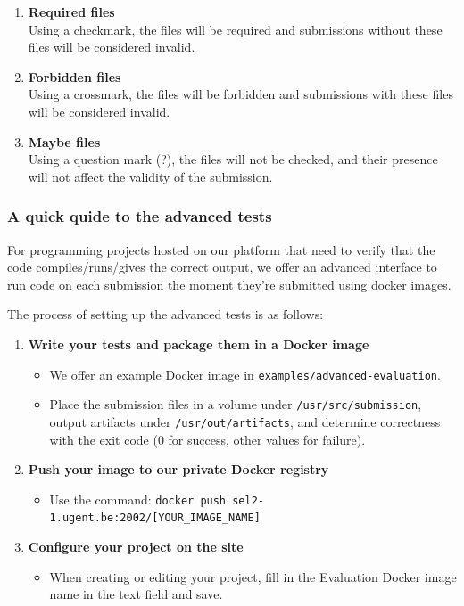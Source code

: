 \documentclass{article}
\begin{document}
\begin{enumerate}[label=\arabic*.]
    \item \textbf{Required files}\\
    Using a checkmark, the files will be required and submissions without these files will be considered invalid.
    
    \item \textbf{Forbidden files}\\
    Using a crossmark, the files will be forbidden and submissions with these files will be considered invalid.
    
    \item \textbf{Maybe files}\\
    Using a question mark (?), the files will not be checked, and their presence will not affect the validity of the submission.
\end{enumerate}

\subsubsection{A quick quide to the advanced tests}

For programming projects hosted on our platform that need to verify that the code compiles/runs/gives the correct output, we offer an advanced interface to run code on each submission the moment they're submitted using docker images.

The process of setting up the advanced tests is as follows:
\begin{enumerate}[label=\textbf{\arabic*.}]
    \item \textbf{Write your tests and package them in a Docker image}
    \begin{itemize}
        \item We offer an example Docker image in \texttt{examples/advanced-evaluation}.
        \item Place the submission files in a volume under \texttt{/usr/src/submission}, output artifacts under \texttt{/usr/out/artifacts}, and determine correctness with the exit code (0 for success, other values for failure).
    \end{itemize}
    
    \item \textbf{Push your image to our private Docker registry}
    \begin{itemize}
        \item Use the command: \texttt{docker push sel2-1.ugent.be:2002/[YOUR\_IMAGE\_NAME]}
    \end{itemize}
    
    \item \textbf{Configure your project on the site}
    \begin{itemize}
        \item When creating or editing your project, fill in the Evaluation Docker image name in the text field and save.
    \end{itemize}
\end{enumerate}
\end{document}
